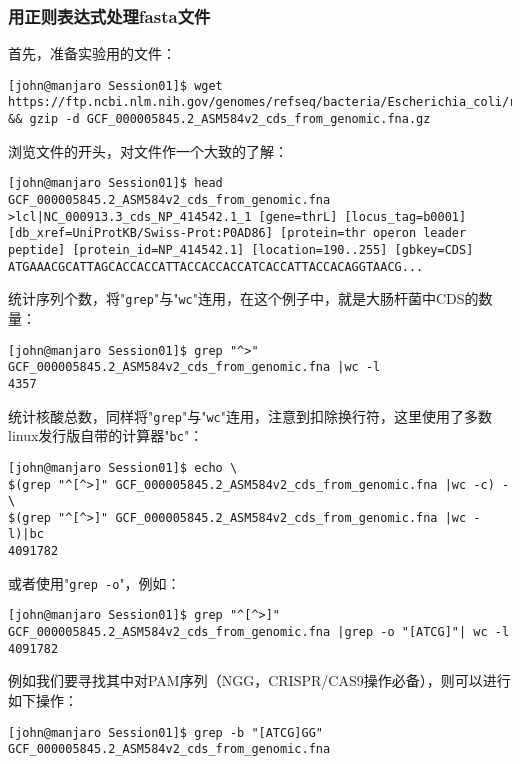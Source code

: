 \subsubsection{用正则表达式处理fasta文件}
首先，准备实验用的文件：
\begin{lstlisting}[frame=none]
[john@manjaro Session01]$ wget https://ftp.ncbi.nlm.nih.gov/genomes/refseq/bacteria/Escherichia_coli/reference/GCF_000005845.2_ASM584v2/GCF_000005845.2_ASM584v2_cds_from_genomic.fna.gz && gzip -d GCF_000005845.2_ASM584v2_cds_from_genomic.fna.gz
\end{lstlisting}
浏览文件的开头，对文件作一个大致的了解：
\begin{lstlisting}[frame=none]
[john@manjaro Session01]$ head GCF_000005845.2_ASM584v2_cds_from_genomic.fna 
>lcl|NC_000913.3_cds_NP_414542.1_1 [gene=thrL] [locus_tag=b0001] [db_xref=UniProtKB/Swiss-Prot:P0AD86] [protein=thr operon leader peptide] [protein_id=NP_414542.1] [location=190..255] [gbkey=CDS]
ATGAAACGCATTAGCACCACCATTACCACCACCATCACCATTACCACAGGTAACG...
\end{lstlisting}
统计序列个数，将"\texttt{grep}"与"\texttt{wc}"连用，在这个例子中，就是大肠杆菌中CDS的数量：
\begin{lstlisting}[frame=none]
[john@manjaro Session01]$ grep "^>" GCF_000005845.2_ASM584v2_cds_from_genomic.fna |wc -l
4357
\end{lstlisting}
统计核酸总数，同样将"\texttt{grep}"与"\texttt{wc}"连用，注意到扣除换行符，这里使用了多数linux发行版自带的计算器"\texttt{bc}"：
\begin{lstlisting}[frame=none]
[john@manjaro Session01]$ echo \
$(grep "^[^>]" GCF_000005845.2_ASM584v2_cds_from_genomic.fna |wc -c) - \
$(grep "^[^>]" GCF_000005845.2_ASM584v2_cds_from_genomic.fna |wc -l)|bc
4091782
\end{lstlisting}
或者使用"\texttt{grep -o}"，例如：
\begin{lstlisting}[frame=none]
[john@manjaro Session01]$ grep "^[^>]" GCF_000005845.2_ASM584v2_cds_from_genomic.fna |grep -o "[ATCG]"| wc -l
4091782
\end{lstlisting}
例如我们要寻找其中对PAM序列（NGG，CRISPR/CAS9操作必备），则可以进行如下操作：
\begin{lstlisting}[frame=none]
[john@manjaro Session01]$ grep -b "[ATCG]GG" GCF_000005845.2_ASM584v2_cds_from_genomic.fna
\end{lstlisting}

